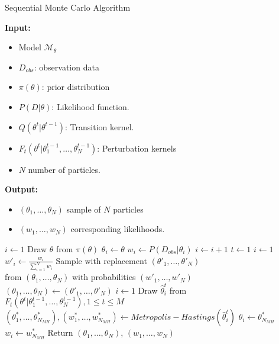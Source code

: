\begin{algorithm}[H]
    \caption{Sequential Monte Carlo Algorithm}
    \label{alg:smc}
    \footnotesize{
        \hspace*{\algorithmicindent} \textbf{Input:}
        \begin{itemize}[noitemsep,topsep=0pt]
            \item Model $\mathcal{M}_\theta$
            \item $D_{obs}$: observation data
            \item $\pi(\theta)$: prior distribution
            \item $P(D|\theta)$: Likelihood function.
            \item $Q(\theta^t|\theta^{t-1})$: Transition kernel.
            \item $F_t(\theta^t|\theta_1^{t-1},\ldots,\theta_N^{t-1})$: Perturbation kernels
            \item $N$ number of particles.
        \end{itemize}
        \hspace*{\algorithmicindent} \textbf{Output:}
        \begin{itemize}[noitemsep,topsep=0pt]
            \item $(\theta_1,\ldots,\theta_N)$ sample of $N$ particles
            \item $(w_1,\ldots,w_N)$ corresponding likelihoods.
        \end{itemize}
    }
    \begin{algorithmic}[1]
        \State $i \leftarrow 1$
         
        \State Draw $\theta$ from $\pi(\theta)$
        \State $\theta_i \leftarrow \theta$
        \State $w_i \leftarrow P(D_{obs}|\theta_i)$
        \State $i \leftarrow i + 1$
        \EndWhile
        \State $t \leftarrow 1$
        \State $i \leftarrow 1$ 
        \State $w'_i \leftarrow \frac{w_i}{\sum_{i=1}^N w_i} $
        \EndWhile
        \State Sample with replacement $(\theta'_1,\ldots,\theta'_N)$  \\\hspace{1.5cm} from $(\theta_1,\ldots,\theta_N)$ with probabilities $(w'_1,\ldots,w'_N)$
        \State $(\theta_1,\ldots,\theta_N) \leftarrow (\theta'_1,\ldots,\theta'_N)$
        \State $i \leftarrow 1$
         
        \State Draw $\hat{\theta}^t_i$ from $F_t(\theta^t | \theta^{t-1}_1,\ldots,\theta^{t-1}_N), 1\leq t \leq M$
        \State $(\theta^*_1,\ldots,\theta^*_{N_{MH}}), (w^*_1,\ldots,w^*_{N_{MH}}) \leftarrow Metropolis-Hastings(\hat{\theta}^t_i)$
        \State $\theta_i \leftarrow \theta^*_{N_{MH}}$
        \State $w_i \leftarrow w^*_{N_{MH}}$
        \EndWhile
        \EndWhile
        \State Return $(\theta_1,\ldots,\theta_{N})$, $(w_1,\ldots,w_{N})$
        \EndProcedure
    \end{algorithmic}
\end{algorithm}
